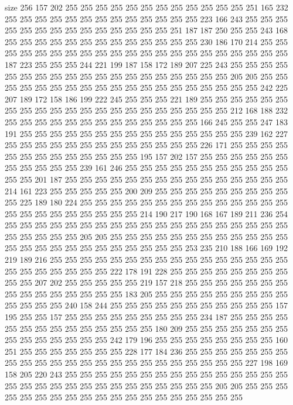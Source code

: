 size 256
157 202 255 255 255 255 255 255 255 255 255 255 255 255 251 165 232 255 255 255
255 255 255 255 255 255 255 255 255 255 223 166 243 255 255 255 255 255 255 255
255 255 255 255 255 255 255 251 187 187 250 255 255 243 168 255 255 255 255 255
255 255 255 255 255 255 255 255 230 186 170 214 255 255 255 255 255 255 255 255
255 255 255 255 255 255 255 255 255 255 255 255 255 187 223 255 255 255 244 221
199 187 158 172 189 207 225 243 255 255 255 255 255 255 255 255 255 255 255 255
255 255 255 255 255 255 255 205 205 255 255 255 255 255 255 255 255 255 255 255
255 255 255 255 255 255 255 255 242 225 207 189 172 158 186 199 222 245 255 255
255 221 189 255 255 255 255 255 255 255 255 255 255 255 255 255 255 255 255 255
255 255 255 255 212 168 188 232 255 255 255 255 255 255 255 255 255 255 255 255
255 166 245 255 255 247 183 191 255 255 255 255 255 255 255 255 255 255 255 255
255 255 255 239 162 227 255 255 255 255 255 255 255 255 255 255 255 255 255 226
171 255 255 255 255 255 255 255 255 255 255 255 255 255 195 157 202 157 255 255
255 255 255 255 255 255 255 255 255 239 161 246 255 255 255 255 255 255 255 255
255 255 255 255 255 201 187 255 255 255 255 255 255 255 255 255 255 255 255 255
255 255 214 161 223 255 255 255 255 255 200 209 255 255 255 255 255 255 255 255
255 255 225 189 180 224 255 255 255 255 255 255 255 255 255 255 255 255 255 255
255 255 255 255 255 255 255 255 255 214 190 217 190 168 167 189 211 236 254 255
255 255 255 255 255 255 255 255 255 255 255 255 255 255 255 255 255 255 255 255
255 255 255 205 205 255 255 255 255 255 255 255 255 255 255 255 255 255 255 255
255 255 255 255 255 255 255 255 255 253 235 210 188 166 169 192 219 189 216 255
255 255 255 255 255 255 255 255 255 255 255 255 255 255 255 255 255 255 255 255
255 255 222 178 191 228 255 255 255 255 255 255 255 255 255 255 207 202 255 255
255 255 255 219 157 218 255 255 255 255 255 255 255 255 255 255 255 255 255 255
255 183 205 255 255 255 255 255 255 255 255 255 255 255 255 255 240 158 244 255
255 255 255 255 255 255 255 255 255 255 157 195 255 255 157 255 255 255 255 255
255 255 255 255 234 187 255 255 255 255 255 255 255 255 255 255 255 255 255 255
180 209 255 255 255 255 255 255 255 255 255 255 255 255 255 255 242 179 196 255
255 255 255 255 255 255 255 160 251 255 255 255 255 255 255 255 228 177 184 236
255 255 255 255 255 255 255 255 255 255 255 255 255 255 255 255 255 255 255 255
255 255 255 227 198 169 158 205 220 243 255 255 255 255 255 255 255 255 255 255
255 255 255 255 255 255 255 255 255 255 255 255 255 255 255 255 255 255 255 205
205 255 255 255 255 255 255 255 255 255 255 255 255 255 255 255 255 255 255 255

